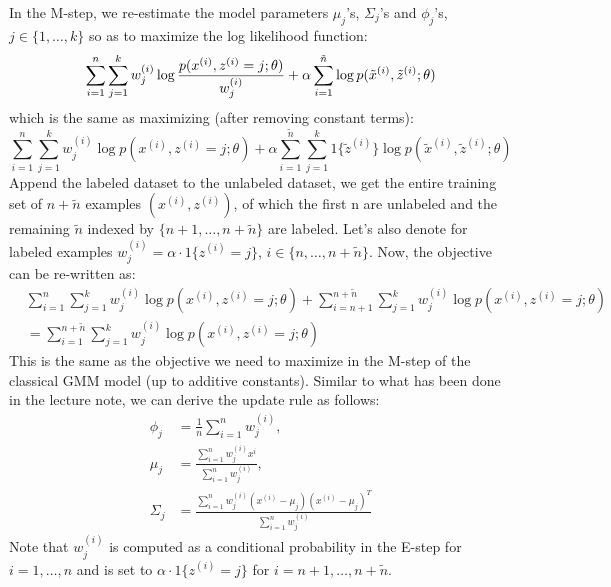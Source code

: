 \begin{answer}
In the M-step, we re-estimate the model parameters $\mu_j$'s, $\Sigma_j$'s and $\phi_j$'s, $j\in\{1,\dots,k\}$ so as to maximize the log likelihood function:
$$ \sum_{i=1}^{n}\sum_{j=1}^k w^{(i)}_j \log \frac{p(x^{(i)},z^{(i)}=j;\theta)}{w^{(i)}_j} + \alpha\sum_{i=1}^{\tilde{n}}\log p(\tilde{x}^{(i)},\tilde{z}^{(i)};\theta) \\ $$
which is the same as maximizing (after removing constant terms):
$$ \sum_{i=1}^{n}\sum_{j=1}^k w^{(i)}_j\log p(x^{(i)},z^{(i)}=j;\theta) + \alpha\sum_{i=1}^{\tilde{n}}\sum_{j=1}^k 1\{\tilde{z}^{(i)}\} \log p(\tilde{x}^{(i)},\tilde{z}^{(i)};\theta) $$
Append the labeled dataset to the unlabeled dataset, we get the entire training set of $n+\tilde{n}$ examples $(x^{(i)},z^{(i)})$, of which the first n are unlabeled and the  remaining $\tilde{n}$ indexed by $\{n+1,\dots,n+\tilde{n}\}$ are labeled. Let's also denote for labeled examples $w^{(i)}_j = \alpha \cdot 1\{z^{(i)}=j\}$, $i\in \{n,\dots, n+\tilde{n}\}$. Now, the objective can be re-written as:
\begin{align*}
	&\sum_{i=1}^{n}\sum_{j=1}^k w^{(i)}_j\log p(x^{(i)},z^{(i)}=j;\theta) + \sum_{i=n+1}^{n+\tilde{n}}\sum_{j=1}^k w^{(i)}_j\log p(x^{(i)},z^{(i)}=j;\theta) \\ 
	&= \sum_{i=1}^{n+\tilde{n}}\sum_{j=1}^k w^{(i)}_j\log p(x^{(i)},z^{(i)}=j;\theta)
\end{align*}
This is the same as the objective we need to maximize in the M-step of the classical GMM model (up to additive constants). Similar to what has been done in the lecture note, we can derive the update rule as follows:
\begin{align*}
	\phi_j &= \frac{1}{n} \sum_{i=1}^n w^{(i)}_j, \\
	\mu_j &= \frac{\sum_{i=1}^n w^{(i)}_j x^{i}}{\sum_{i=1}^n w^{(i)}_j}, \\
	\Sigma_j &= \frac{\sum_{i=1}^{n} w^{(i)}_j (x^{(i)}-\mu_j)(x^{(i)}-\mu_j)^T}{\sum_{i=1}^n w^{(i)}_j}
\end{align*}
Note that $w^{(i)}_j$ is computed as a conditional probability in the E-step for $i=1,\dots,n$ and is set to $\alpha \cdot 1\{z^{(i)}=j\}$ for $i=n+1,\dots,n+\tilde{n}$. \\
\end{answer}
















